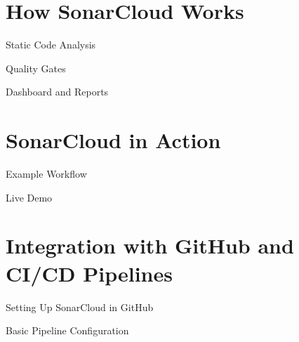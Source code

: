 \documentclass{beamer}
\begin{document}
\section[How SonarCloud Works]{How SonarCloud Works}

\begin{frame}{Static Code Analysis}
\end{frame}

\begin{frame}{Quality Gates}
 
\end{frame}

\begin{frame}{Dashboard and Reports}
 
\end{frame}


\section[SonarCloud in Action]{SonarCloud in Action}

\begin{frame}{Example Workflow}

\end{frame}

\begin{frame}{Live Demo}
 
\end{frame}

\section[ Integration with GitHub and CI/CD Pipelines]{Integration with GitHub and CI/CD Pipelines}

\begin{frame}{Setting Up SonarCloud in GitHub}
 
\end{frame}

\begin{frame}{Basic Pipeline Configuration}
 
\end{frame}
\end{document}
